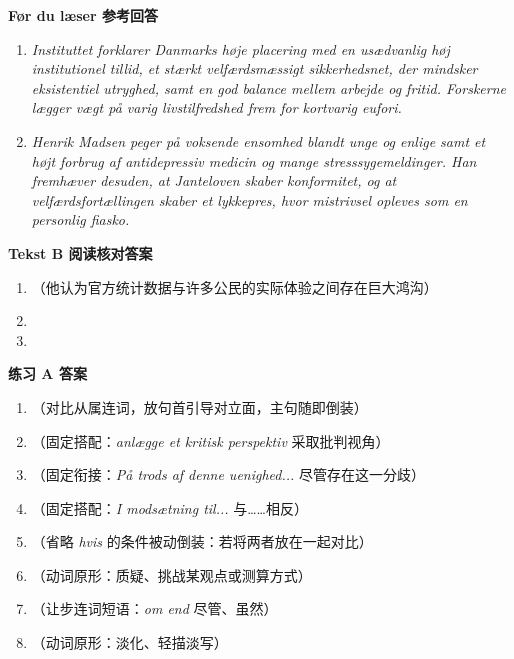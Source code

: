 \begin{answerbox}
\textbf{Før du læser 参考回答}
\begin{enumerate}
  \item \textit{Instituttet forklarer Danmarks høje placering med en usædvanlig høj institutionel tillid, et stærkt velfærdsmæssigt sikkerhedsnet, der mindsker eksistentiel utryghed, samt en god balance mellem arbejde og fritid. Forskerne lægger vægt på varig livstilfredshed frem for kortvarig eufori.}
  \item \textit{Henrik Madsen peger på voksende ensomhed blandt unge og enlige samt et højt forbrug af antidepressiv medicin og mange stresssygemeldinger. Han fremhæver desuden, at Janteloven skaber konformitet, og at velfærdsfortællingen skaber et lykkepres, hvor mistrivsel opleves som en personlig fiasko.}
\end{enumerate}

\textbf{Tekst B 阅读核对答案}
\begin{enumerate}
  \item {}（他认为官方统计数据与许多公民的实际体验之间存在巨大鸿沟）
  \item {}
  \item {}
\end{enumerate}

\textbf{练习 A 答案}
\begin{enumerate}
  \item {}（对比从属连词，放句首引导对立面，主句随即倒装）
  \item {}（固定搭配：\textit{anlægge et kritisk perspektiv} 采取批判视角）
  \item {}（固定衔接：\textit{På trods af denne uenighed...} 尽管存在这一分歧）
  \item {}（固定搭配：\textit{I modsætning til...} 与……相反）
  \item {}（省略 \textit{hvis} 的条件被动倒装：若将两者放在一起对比）
  \item {}（动词原形：质疑、挑战某观点或测算方式）
  \item {}（让步连词短语：\textit{om end} 尽管、虽然）
  \item {}（动词原形：淡化、轻描淡写）
\end{enumerate}


\end{answerbox}
